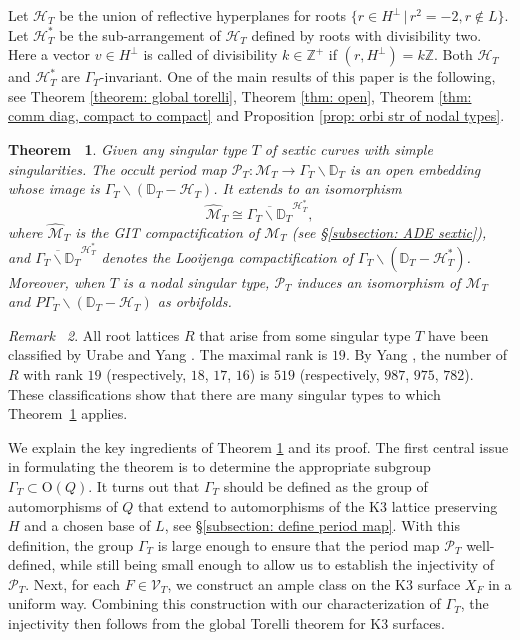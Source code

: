 \documentclass[12pt,reqno,a4paper]{amsart}
\newtheorem{thm}{Theorem~}[section]
\theoremstyle{remark}
\newtheorem{rmk}[thm]{Remark~}
\theoremstyle{definition}
\begin{document}
Let $\mathcal{H}_T$ be the union of reflective hyperplanes for roots $\{ r\in H^\perp \,|\, r^2=-2, r\notin L \}$.
Let $\mathcal{H}_T^*$ be the sub-arrangement of $\mathcal{H}_T$ defined by roots with divisibility two. Here a vector $v\in H^\perp$ is called of divisibility $k\in \mathbb{Z}^+$ if $(r, H^\perp)=k\mathbb{Z}$.  Both $\mathcal{H}_T$ and $\mathcal{H}_T^*$ are  $\Gamma_T$-invariant. 
One of the main results of this paper is the following, see Theorem \ref{theorem: global torelli}, Theorem \ref{thm: open}, Theorem \ref{thm: comm diag, compact to compact} and Proposition \ref{prop: orbi str of nodal types}.
\begin{thm}
\label{thm: main in intro}
Given any singular type $T$ of sextic curves with simple singularities. The occult period map $\mathscr{P}_T\colon \mathcal{M}_T \to \Gamma_{T}\backslash \mathbb{D}_T$ is an open embedding whose image is $\Gamma_T\backslash(\mathbb{D}_T-\mathcal{H}_T)$.
It extends to an isomorphism  
    \[  
    \widehat{\mathcal{M}}_T \cong \overline{\Gamma_T \backslash \mathbb{D}_T}^{\mathcal{H}_T^*},  
    \]  
    where $\widehat{\mathcal{M}}_T$ is the GIT compactification of $\mathcal{M}_T$ (see \S \ref{subsection: ADE sextic}), and $\overline{\Gamma_T \backslash \mathbb{D}_T}^{\mathcal{H}_T^*}$ denotes the Looijenga compactification of $\Gamma_T \backslash (\mathbb{D}_T - \mathcal{H}_T^*)$. 
    Moreover, when $T$ is a nodal singular type, $\mathscr{P}_T$ induces an isomorphism of $\mathcal{M}_T$ and $P\Gamma_T\backslash(\mathbb{D}_T-\mathcal{H}_T)$ as orbifolds.
\end{thm}
\begin{rmk}
    All root lattices $R$ that arise from some singular type $T$ have been classified by Urabe \cite{urabe1988combinations} and Yang \cite{yang1996sextic}. The maximal rank is $19$.
    By Yang \cite[Thm 2.1]{yang1996sextic}, the number of $R$ with rank $19$ (respectively, $18$, $17$, $16$) is $519$ (respectively, $987$, $975$, $782$).
    These classifications show that there are many singular types to which Theorem~\ref{thm: main in intro} applies.
\end{rmk}

We explain the key ingredients of Theorem \ref{thm: main in intro} and its proof. The first central issue in formulating the theorem is to determine the appropriate subgroup $\Gamma_T \subset \mathrm{O}(Q)$. It turns out that $\Gamma_T$ should be defined as the group of automorphisms of $Q$ that extend to automorphisms of the K3 lattice preserving $H$ and a chosen base of $L$, see \S\ref{subsection: define period map}. With this definition, the group $\Gamma_T$ is large enough to ensure that the period map $\mathscr{P}_T$ well-defined, while still being small enough to allow us to establish the injectivity of $\mathscr{P}_T$. 
Next, for each $F\in\mathcal{V}_T$, we construct an ample class on the K3 surface $X_F$ in a uniform way. 
Combining this construction with our characterization of $\Gamma_T$, the injectivity then follows from the global Torelli theorem for K3 surfaces.
\end{document}

